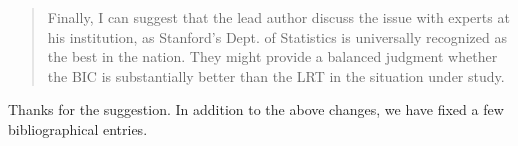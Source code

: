 \documentclass{article}
\newenvironment{referee}
{\begin{quote}\color{red}}
  {\end{quote}}
\newenvironment{reply}
  {}
  {}
\begin{document}
\begin{referee}
Finally, I can suggest that the lead author discuss the issue with experts
at his institution, as Stanford's Dept. of Statistics is universally
recognized as the best in the nation. They might provide a balanced
judgment whether the BIC is substantially better than the LRT in the
situation under study.
\end{referee}


\begin{reply}
Thanks for the suggestion.  In addition to the above changes, we have
fixed a few bibliographical entries.
\end{reply}
\end{document}
